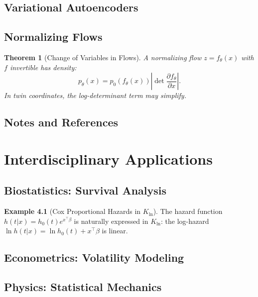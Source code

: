 \documentclass[11pt,twoside]{book}
\theoremstyle{plain}
\newtheorem{theorem}{Theorem}[chapter]
\theoremstyle{definition}
\newtheorem{example}[theorem]{Example}
\theoremstyle{remark}
\newcommand{\Kln}{K_{\ln}}
\begin{document}
\section{Variational Autoencoders}
\label{sec:vae}

\section{Normalizing Flows}
\label{sec:flows}

\begin{theorem}[Change of Variables in Flows]
    A normalizing flow $z = f_\theta(x)$ with $f$ invertible has density:
    \[
    p_\theta(x) = p_0(f_\theta(x)) \left|\det \frac{\partial f_\theta}{\partial x}\right|.
    \]
    In twin coordinates, the log-determinant term may simplify.
\end{theorem}

\section{Notes and References}
\label{sec:ch16_notes}


\chapter{Interdisciplinary Applications}
\label{ch:applications}

\section{Biostatistics: Survival Analysis}
\label{sec:survival}

\begin{example}[Cox Proportional Hazards in $\Kln$]
    The hazard function $h(t | x) = h_0(t) e^{x^\top \beta}$ is naturally expressed in $\Kln$: the log-hazard $\ln h(t|x) = \ln h_0(t) + x^\top \beta$ is linear.
\end{example}

\section{Econometrics: Volatility Modeling}
\label{sec:econometrics}

\section{Physics: Statistical Mechanics}
\label{sec:physics}
\end{document}
